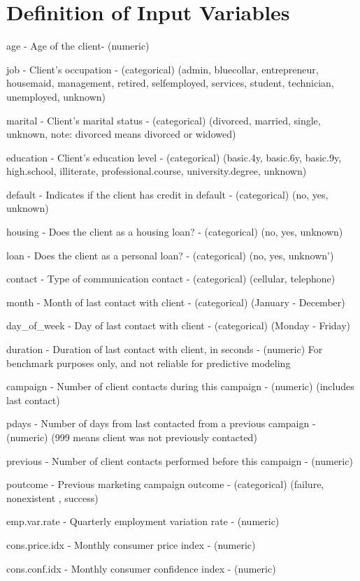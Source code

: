 \section{Definition of Input Variables}
age - Age of the client- (numeric)

job - Client’s occupation - (categorical)
(admin, bluecollar, entrepreneur, housemaid, management, retired, selfemployed, services, student, technician, unemployed, unknown)

marital - Client’s marital status - (categorical)
(divorced, married, single, unknown, note: divorced means divorced or widowed)

education - Client’s education level - (categorical)
(basic.4y, basic.6y, basic.9y, high.school, illiterate, professional.course, university.degree, unknown)

default - Indicates if the client has credit in default - (categorical)
(no, yes, unknown)

housing - Does the client as a housing loan? - (categorical)
(no, yes, unknown)

loan - Does the client as a personal loan? - (categorical)
(no, yes, unknown’)

contact - Type of communication contact - (categorical)
(cellular, telephone)

month - Month of last contact with client - (categorical)
(January - December)

day_of_week - Day of last contact with client - (categorical)
(Monday - Friday)

duration - Duration of last contact with client, in seconds - (numeric)
For benchmark purposes only, and not reliable for predictive modeling

campaign - Number of client contacts during this campaign - (numeric)
(includes last contact)

pdays - Number of days from last contacted from a previous campaign - (numeric)
(999 means client was not previously contacted)

previous - Number of client contacts performed before this campaign - (numeric)

poutcome - Previous marketing campaign outcome - (categorical)
(failure, nonexistent , success)

emp.var.rate - Quarterly employment variation rate - (numeric)

cons.price.idx - Monthly consumer price index - (numeric)

cons.conf.idx - Monthly consumer confidence index - (numeric)

